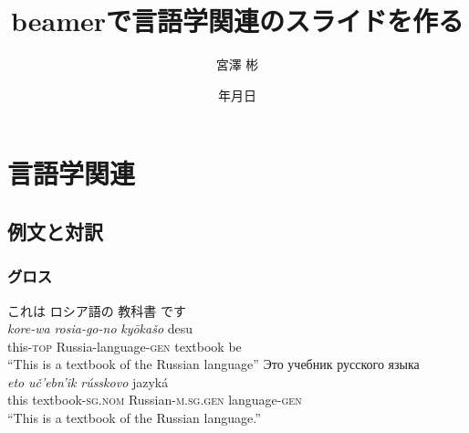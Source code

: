 \documentclass[12pt]{beamer}
\title{beamerで言語学関連のスライドを作る}
\institute{総合研究大学院大学}
\author{宮澤 彬}
\date{{\number\year}年{\number\month}月{\number\day}日}
\begin{document}
\begin{frame}
    \nocite{demo}
    \maketitle
\end{frame}

\section{言語学関連}
\subsection{例文と対訳}
\begin{frame}
\setlength{\glossglue}{5pt plus 2pt minus 1pt}\footnotesize
\frametitle{グロス}
    \begin{exe}
        \ex%
        \glll%
        {これは} {ロシア語の} {教科書} {です} \\
        {\textit{kore-wa}} {\textit{rosia-go-no}} {\textit{kyōkašo}} {desu} \\
        {this-\textsc{top}} {Russia-language-\textsc{gen}} {textbook} {be} \\
        \trans%
        ``This is a textbook of the Russian language''
        \ex%
        \glll%
        {Это} {учебник} {русского} {языка} \\
        {\textit{eto}} {\textit{uč'ebn'ik}} {\textit{rússkovo}} {jazyká} \\
        {this} {textbook-\textsc{sg.nom}} {Russian-\textsc{m.sg.gen}} {language-\textsc{gen}} \\
        \trans%
        ``This is a textbook of the Russian language.''
    \end{exe}
\end{frame}
\end{document}

